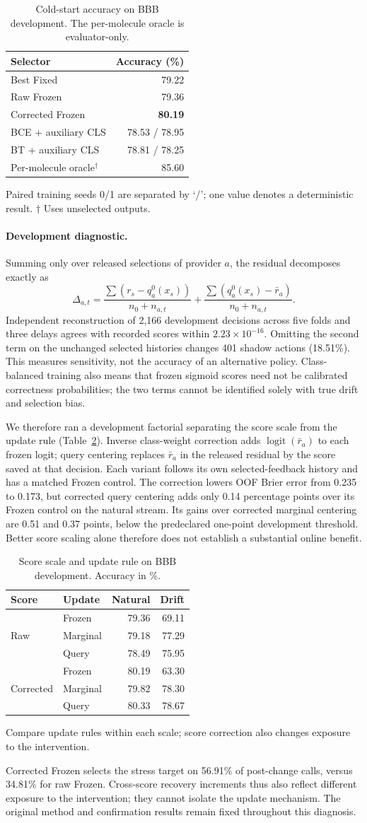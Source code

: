 \documentclass[sigconf,anonymous]{aamas}
\makeatletter
\newcommand{\MiraTableFont}{\fontsize{9}{11}\selectfont}
\newcommand{\tnote}[1]{{\fontsize{8.5}{10}\selectfont\raggedright\par\vspace{3pt}#1\par}}
\newcommand{\MiraPriorCaption}{Cold-start accuracy on BBB development. The per-molecule oracle is evaluator-only.}
\newcommand{\MiraPriorLabels}{\label{tab:learned-prior}}
\newcommand{\MiraPriorBody}{%
\begingroup\centering\MiraTableFont\setlength{\tabcolsep}{9pt}\renewcommand{\arraystretch}{1.08}
\begin{tabular}{@{}lr@{}}
\toprule
Selector & Accuracy (\%) \\
\midrule
Best Fixed & 79.22 \\
Raw Frozen & 79.36 \\
Corrected Frozen & \textbf{80.19} \\
\midrule
BCE + auxiliary CLS & 78.53 / 78.95 \\
BT + auxiliary CLS & 78.81 / 78.25 \\
\midrule
Per-molecule oracle$^{\dagger}$ & 85.60 \\
\bottomrule
\end{tabular}\par
\tnote{Paired training seeds 0/1 are separated by `/'; one value denotes a deterministic result. $\dagger$ Uses unselected outputs.}
\endgroup}
\newcommand{\MiraCenterCaption}{Score scale and update rule on BBB development. Accuracy in \%.}
\newcommand{\MiraCenterLabels}{\label{tab:centering-diagnostic}}
\newcommand{\MiraCenterBody}{%
\begingroup\centering\MiraTableFont\setlength{\tabcolsep}{6pt}\renewcommand{\arraystretch}{1.08}
\begin{tabular}{@{}llrr@{}}
\toprule
Score & Update & Natural & Drift \\
\midrule
\multirow{3}{*}{Raw} & Frozen & 79.36 & 69.11 \\
& Marginal & 79.18 & 77.29 \\
& Query & 78.49 & 75.95 \\
\midrule
\multirow{3}{*}{Corrected} & Frozen & 80.19 & 63.30 \\
& Marginal & 79.82 & 78.30 \\
& Query & 80.33 & 78.67 \\
\bottomrule
\end{tabular}\par
\tnote{Compare update rules within each scale; score correction also changes exposure to the intervention.}
\endgroup}
\makeatother
\begin{document}
\begin{table}[t]
\caption{\MiraPriorCaption}
\MiraPriorLabels
\MiraPriorBody
\end{table}


\paragraph{Development diagnostic.}
Summing only over released selections of provider $a$, the residual decomposes exactly as
\begin{equation}
\Delta_{a,t}=\frac{\sum(r_s-q_a^0(x_s))}{n_0+n_{a,t}}
            +\frac{\sum(q_a^0(x_s)-\bar r_a)}{n_0+n_{a,t}}.
\end{equation}
Independent reconstruction of 2,166 development decisions across five folds and three delays agrees with recorded scores within $2.23\times10^{-16}$. Omitting the second term on the unchanged selected histories changes 401 shadow actions (18.51\%). This measures sensitivity, not the accuracy of an alternative policy. Class-balanced training also means that frozen sigmoid scores need not be calibrated correctness probabilities; the two terms cannot be identified solely with true drift and selection bias.

We therefore ran a development factorial separating the score scale from the update rule (Table~\ref{tab:centering-diagnostic}). Inverse class-weight correction adds $\operatorname{logit}(\bar r_a)$ to each frozen logit; query centering replaces $\bar r_a$ in the released residual by the score saved at that decision. Each variant follows its own selected-feedback history and has a matched Frozen control. The correction lowers OOF Brier error from 0.235 to 0.173, but corrected query centering adds only 0.14 percentage points over its Frozen control on the natural stream. Its gains over corrected marginal centering are 0.51 and 0.37 points, below the predeclared one-point development threshold. Better score scaling alone therefore does not establish a substantial online benefit.

\begin{table}[t]
\caption{\MiraCenterCaption}
\MiraCenterLabels
\MiraCenterBody
\end{table}

Corrected Frozen selects the stress target on 56.91\% of post-change calls, versus 34.81\% for raw Frozen. Cross-score recovery increments thus also reflect different exposure to the intervention; they cannot isolate the update mechanism. The original method and confirmation results remain fixed throughout this diagnosis.
\end{document}
